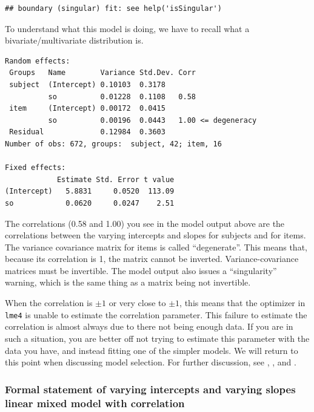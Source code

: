 \documentclass[
  12pt,
]{krantz}
\theoremstyle{definition}
\theoremstyle{definition}
\theoremstyle{definition}
\theoremstyle{definition}
\theoremstyle{remark}
\begin{document}
\begin{verbatim}
## boundary (singular) fit: see help('isSingular')
\end{verbatim}

To understand what this model is doing, we have to recall what a bivariate/multivariate distribution is.

\begin{verbatim}
Random effects:
 Groups   Name        Variance Std.Dev. Corr
 subject  (Intercept) 0.10103  0.3178       
          so          0.01228  0.1108   0.58
 item     (Intercept) 0.00172  0.0415       
          so          0.00196  0.0443   1.00 <= degeneracy
 Residual             0.12984  0.3603       
Number of obs: 672, groups:  subject, 42; item, 16

Fixed effects:
            Estimate Std. Error t value
(Intercept)   5.8831     0.0520  113.09
so            0.0620     0.0247    2.51
\end{verbatim}

The correlations (0.58 and 1.00) you see in the model output above are the correlations between the varying intercepts and slopes for subjects and for items. The variance covariance matrix for items is called ``degenerate''. This means that, because its correlation is 1, the matrix cannot be inverted. Variance-covariance matrices must be invertible. The model output also issues a ``singularity'' warning, which is the same thing as a matrix being not invertible.

When the correlation is \(\pm 1\) or very close to \(\pm 1\), this means that the optimizer in \texttt{lme4} is unable to estimate the correlation parameter. This failure to estimate the correlation is almost always due to there not being enough data. If you are in such a situation, you are better off not trying to estimate this parameter with the data you have, and instead fitting one of the simpler models. We will return to this point when discussing model selection. For further discussion, see \citet{barr2013}, \citet{BatesEtAlParsimonious}, and \citet{hannesBEAP}.

\hypertarget{formal-statement-of-varying-intercepts-and-varying-slopes-linear-mixed-model-with-correlation}{%
\subsubsection{Formal statement of varying intercepts and varying slopes linear mixed model with correlation}\label{formal-statement-of-varying-intercepts-and-varying-slopes-linear-mixed-model-with-correlation}}
\end{document}

